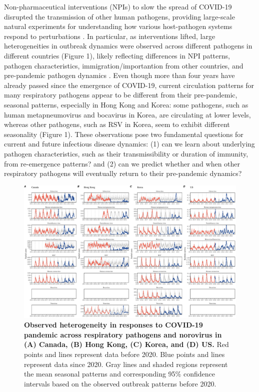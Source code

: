 \documentclass[12pt]{article}
\begin{document}
Non-pharmaceutical interventions (NPIs) to slow the spread of COVID-19 disrupted the transmission of other human pathogens, providing large-scale natural experiments for understanding how various host-pathogen systems respond to perturbations \citep{baker2020impact,gomez2021uncertain,koltai2022determinants,park2024predicting}.
In particular, as interventions lifted, large heterogeneities in outbreak dynamics were observed across different pathogens in different countries (Figure 1), likely reflecting differences in NPI patterns, pathogen characteristics, immigration/importantion from other countries, and pre-pandemic pathogen dynamics \citep{chow2023effects}.
Even though more than four years have already passed since the emergence of COVID-19, current circulation patterns for many respiratory pathogens appear to be different from their pre-pandemic, seasonal patterns, especially in Hong Kong and Korea:
some pathogens, such as human metapneumovirus and bocavirus in Korea, are circulating at lower levels, whereas other pathogens, such as RSV in Korea, seem to exhibit different seasonality (Figure 1).
These observations pose two fundamental questions for current and future infectious disease dynamics: (1) can we learn about underlying pathogen characteristics, such as their transmissibility or duration of immunity, from re-emergence patterns? and (2) can we predict whether and when other respiratory pathogens will eventually return to their pre-pandemic dynamics?

\begin{figure}[!th]
\includegraphics[width=\textwidth]{../figure1/figure1.pdf}
\caption{
\textbf{Observed heterogeneity in responses to COVID-19 pandemic across respiratory pathogens and norovirus in (A) Canada, (B) Hong Kong, (C) Korea, and (D) US.}
Red points and lines represent data before 2020.
Blue points and lines represent data since 2020.
Gray lines and shaded regions represent the mean seasonal patterns and corresponding 95\% confidence intervals based on the observed outbreak patterns before 2020.
}
\end{figure} 
\end{document}
